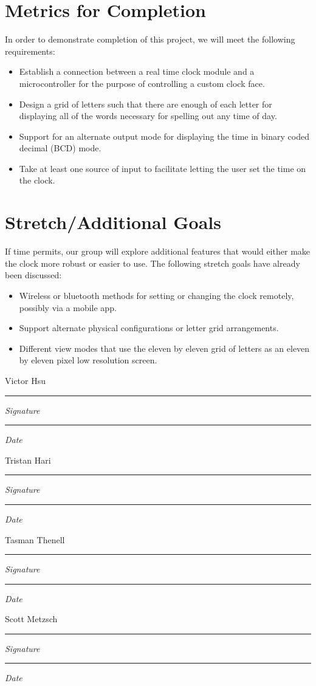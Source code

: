 \documentclass[10pt,draftclsnofoot,onecolumn]{IEEEtran}
\newcommand{\namesigdate}[2][7cm]{%
\begin{minipage}{#1}
    #2 \vspace{1.0cm}\hrule\smallskip
    \small \textit{Signature}
    \vspace{1.0cm}\hrule\smallskip
    \small \textit{Date}
\end{minipage}
}
\begin{document}
\section{Metrics for Completion}
In order to demonstrate completion of this project, we will meet the following requirements:
\begin{itemize}
  \item Establish a connection between a real time clock module and a
  microcontroller for the purpose of controlling a custom clock face.
  \item Design a grid of letters such that there are enough of each letter for displaying
  all of the words necessary for spelling out any time of day.
  \item Support for an alternate output mode for displaying the time in binary coded
  decimal (BCD) mode.
  \item Take at least one source of input to facilitate letting the user set the
  time on the clock.
\end{itemize}

\section{Stretch/Additional Goals}
If time permits, our group will explore additional features that would either
make the clock more robust or easier \quad to use. The following stretch goals have
already been discussed:
\begin{itemize}
  \item Wireless or bluetooth methods for setting or changing the clock remotely,
  possibly via a mobile app.
  \item Support alternate physical configurations or letter grid arrangements.
  \item Different view modes that use the eleven by eleven grid of letters as an
  eleven by eleven pixel low resolution screen.
\end{itemize}

\newpage
\newpage

\noindent \namesigdate{Victor Hsu} \hfill \namesigdate{Tristan Hari} \par
\vspace{2cm}
\noindent \namesigdate{Tasman Thenell} \hfill \namesigdate{Scott Metzsch}
\end{document}

